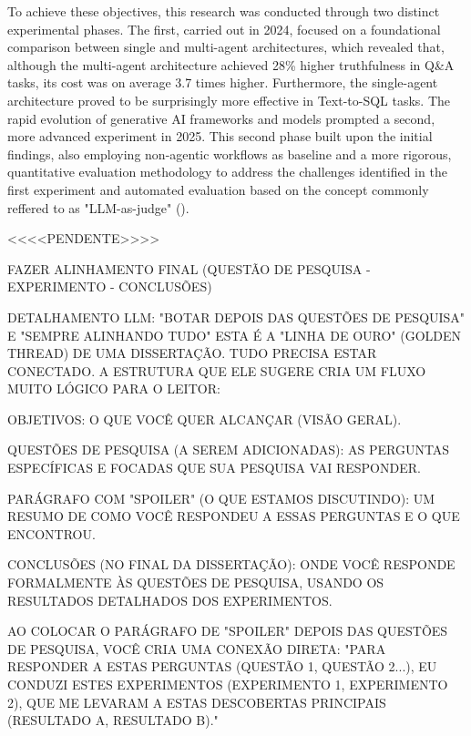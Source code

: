     To achieve these objectives, this research was conducted through two distinct experimental phases. The first, carried out in 2024, focused on a foundational comparison between single and multi-agent architectures, which revealed that, although the multi-agent architecture achieved 28\% higher truthfulness in Q\&A tasks, its cost was on average 3.7 times higher. Furthermore, the single-agent architecture proved to be surprisingly more effective in Text-to-SQL tasks. The rapid evolution of generative AI frameworks and models prompted a second, more advanced experiment in 2025. This second phase built upon the initial findings, also employing non-agentic workflows as baseline and a more rigorous, quantitative evaluation methodology to address the challenges identified in the first experiment and automated evaluation based on the concept commonly reffered to as "LLM-as-judge" (\citep{Gu2025}).
    

    <<<<PENDENTE>>>>

    FAZER ALINHAMENTO FINAL (QUESTÃO DE PESQUISA - EXPERIMENTO - CONCLUSÕES)
    
    DETALHAMENTO LLM: "BOTAR DEPOIS DAS QUESTÕES DE PESQUISA" E "SEMPRE ALINHANDO TUDO"
    ESTA É A "LINHA DE OURO" (GOLDEN THREAD) DE UMA DISSERTAÇÃO. TUDO PRECISA ESTAR CONECTADO. A ESTRUTURA QUE ELE SUGERE CRIA UM FLUXO MUITO LÓGICO PARA O LEITOR:
    
    OBJETIVOS: O QUE VOCÊ QUER ALCANÇAR (VISÃO GERAL).
    
    QUESTÕES DE PESQUISA (A SEREM ADICIONADAS): AS PERGUNTAS ESPECÍFICAS E FOCADAS QUE SUA PESQUISA VAI RESPONDER.
    
    PARÁGRAFO COM "SPOILER" (O QUE ESTAMOS DISCUTINDO): UM RESUMO DE COMO VOCÊ RESPONDEU A ESSAS PERGUNTAS E O QUE ENCONTROU.
    
    CONCLUSÕES (NO FINAL DA DISSERTAÇÃO): ONDE VOCÊ RESPONDE FORMALMENTE ÀS QUESTÕES DE PESQUISA, USANDO OS RESULTADOS DETALHADOS DOS EXPERIMENTOS.

    AO COLOCAR O PARÁGRAFO DE "SPOILER" DEPOIS DAS QUESTÕES DE PESQUISA, VOCÊ CRIA UMA CONEXÃO DIRETA: "PARA RESPONDER A ESTAS PERGUNTAS (QUESTÃO 1, QUESTÃO 2...), EU CONDUZI ESTES EXPERIMENTOS (EXPERIMENTO 1, EXPERIMENTO 2), QUE ME LEVARAM A ESTAS DESCOBERTAS PRINCIPAIS (RESULTADO A, RESULTADO B)."

